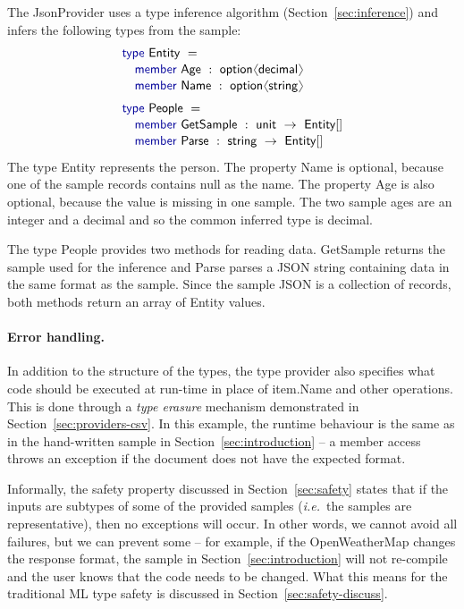 \documentclass[preprint]{sigplanconf}
\newcommand{\langl}{\begin{picture}(4.5,7)
\put(1.1,2.5){\rotatebox{60}{\line(1,0){5.5}}}
\put(1.1,2.5){\rotatebox{300}{\line(1,0){5.5}}}
\end{picture}}
\newcommand{\rangl}{\begin{picture}(4.5,7)
\put(.9,2.5){\rotatebox{120}{\line(1,0){5.5}}}
\put(.9,2.5){\rotatebox{240}{\line(1,0){5.5}}}
\end{picture}}
\newcommand{\kvd}[1]{\textnormal{\textcolor{kvdclr}{\sffamily #1}}}
\newcommand{\num}[1]{\textnormal{\textcolor{numclr}{\sffamily #1}}}
\newcommand{\ident}[1]{\textnormal{\sffamily #1}}
\begin{document}
The \ident{JsonProvider} uses a type inference algorithm (Section~\ref{sec:inference})  and
infers the following types from the sample:
%
\begin{equation*}
\begin{array}{l}
 \kvd{type}~\ident{Entity}~=  \\[0.1em]
 \quad \kvd{member}~\ident{Age}~:~\ident{option}\langl \ident{decimal}\rangl \\[0.1em]
 \quad \kvd{member}~\ident{Name}~:~\ident{option}\langl \ident{string}\rangl \\[0.6em]
 \kvd{type}~\ident{People}~=  \\[0.1em]
 \quad \kvd{member}~\ident{GetSample}~:~\ident{unit}~\rightarrow~\ident{Entity}[] \\[0.1em]
 \quad \kvd{member}~\ident{Parse}~:~\ident{string}~\rightarrow~\ident{Entity}[] \\[0.1em]
\end{array}
\end{equation*}
%
The type \ident{Entity} represents the person. The property \ident{Name} is optional, because
one of the sample records contains \kvd{null} as the name. The property \ident{Age} is also optional,
because the value is missing in one sample. The two sample ages are an integer \num{25} and a 
decimal \num{3.5} and so the common inferred type is \ident{decimal}.

The type \ident{People} provides two methods for reading data. \ident{GetSample} returns the
sample used for the inference and \ident{Parse} parses a JSON string containing data in the same 
format as the sample. Since the sample JSON is a collection of records, both methods return an 
array of \ident{Entity} values.

\paragraph{Error handling.}
In addition to the structure of the types, the type provider also specifies what code should be 
executed at run-time in place of \ident{item.Name} and other operations. This is done through a 
\emph{type erasure} mechanism demonstrated in Section~\ref{sec:providers-csv}. In this example,
the runtime behaviour is the same as in the hand-written sample in Section~\ref{sec:introduction} --
a member access throws an exception if the document does not have the expected format.

Informally, the safety property discussed in Section~\ref{sec:safety} states that if the inputs
are subtypes of some of the provided samples (\emph{i.e.}~the samples are representative), then
no exceptions will occur. In other words, we cannot avoid all failures, but we can prevent some --
for example, if the OpenWeatherMap changes the response format, the sample in Section~\ref{sec:introduction}
will not re-compile and the user knows that the code needs to be changed. What this means for
the traditional ML type safety is discussed in Section~\ref{sec:safety-discuss}.
\end{document}
